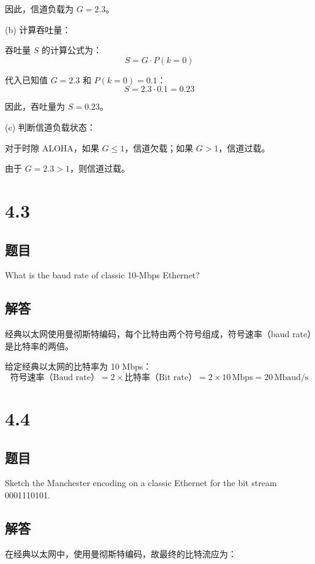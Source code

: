 因此，信道负载为 \(G = 2.3\)。

\vspace{0.5cm}

(b) 计算吞吐量：

吞吐量 \(S\) 的计算公式为：
\[
S = G \cdot P(k = 0)
\]

代入已知值 \(G = 2.3\) 和 \(P(k = 0) = 0.1\)：
\[
S = 2.3 \cdot 0.1 = 0.23
\]

因此，吞吐量为 \(S = 0.23\)。

\vspace{0.5cm}

(c) 判断信道负载状态：

对于时隙 ALOHA，如果 \(G \leq 1\)，信道欠载；如果 \(G > 1\)，信道过载。

由于 \(G = 2.3 > 1\)，则信道过载。

\section{4.3}

\subsection*{题目}
What is the baud rate of classic 10-Mbps Ethernet?

\subsection*{解答}

经典以太网使用曼彻斯特编码，每个比特由两个符号组成，符号速率（baud rate）是比特率的两倍。

给定经典以太网的比特率为 10 Mbps：
\[
\text{符号速率（Baud rate）} = 2 \times \text{比特率（Bit rate）} = 2 \times 10 \, \text{Mbps} = 20 \, \text{Mbaud/s}
\]

\section{4.4}

\subsection*{题目}
Sketch the Manchester encoding on a classic Ethernet for the bit stream 0001110101.

\subsection*{解答}
在经典以太网中，使用曼彻斯特编码，故最终的比特流应为：

